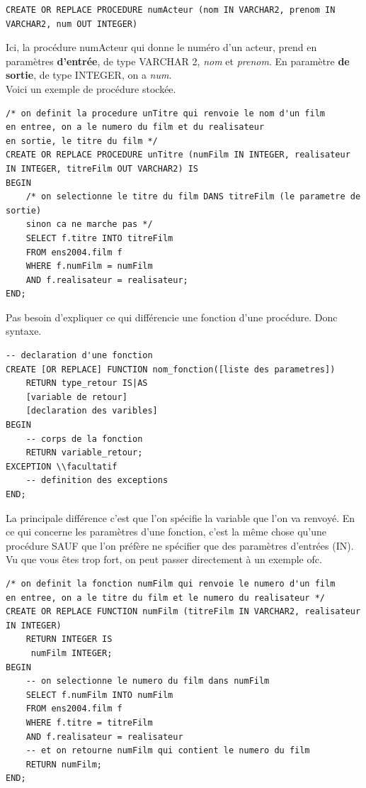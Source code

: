 \documentclass{report}
\begin{document}
\begin{lstlisting}[style=MySQLStyle]
CREATE OR REPLACE PROCEDURE numActeur (nom IN VARCHAR2, prenom IN VARCHAR2, num OUT INTEGER)
\end{lstlisting}

Ici, la procédure numActeur qui donne le numéro d'un acteur, prend en paramètres \textbf{d'entrée}, de type VARCHAR 2, \textit{nom} et \textit{prenom}. En paramètre \textbf{de sortie}, de type INTEGER, on a \textit{num}.\\

Voici un exemple de procédure stockée.

\begin{lstlisting}[style=MySQLStyle]
/* on definit la procedure unTitre qui renvoie le nom d'un film
en entree, on a le numero du film et du realisateur
en sortie, le titre du film */
CREATE OR REPLACE PROCEDURE unTitre (numFilm IN INTEGER, realisateur IN INTEGER, titreFilm OUT VARCHAR2) IS
BEGIN
	/* on selectionne le titre du film DANS titreFilm (le parametre de sortie)
	sinon ca ne marche pas */
	SELECT f.titre INTO titreFilm
	FROM ens2004.film f
	WHERE f.numFilm = numFilm
	AND f.realisateur = realisateur;
END;
\end{lstlisting}

Pas besoin d'expliquer ce qui différencie une fonction d'une procédure. Donc syntaxe.
\begin{lstlisting}[style=MySQLStyle]
-- declaration d'une fonction
CREATE [OR REPLACE] FUNCTION nom_fonction([liste des parametres]) 
	RETURN type_retour IS|AS
	[variable de retour]
	[declaration des varibles]
BEGIN
	-- corps de la fonction
	RETURN variable_retour;
EXCEPTION \\facultatif
	-- definition des exceptions
END;
\end{lstlisting}
La principale différence c'est que l'on spécifie la variable que l'on va renvoyé.
En ce qui concerne les paramètres d'une fonction, c'est la même chose qu'une procédure SAUF que l'on préfère ne spécifier que des paramètres d'entrées (IN).\\
Vu que vous êtes trop fort, on peut passer directement à un exemple ofc.
\begin{lstlisting}[style=MySQLStyle]
/* on definit la fonction numFilm qui renvoie le numero d'un film
en entree, on a le titre du film et le numero du realisateur */
CREATE OR REPLACE FUNCTION numFilm (titreFilm IN VARCHAR2, realisateur IN INTEGER)
	RETURN INTEGER IS
	 numFilm INTEGER;
BEGIN
	-- on selectionne le numero du film dans numFilm
	SELECT f.numFilm INTO numFilm
	FROM ens2004.film f
	WHERE f.titre = titreFilm
	AND f.realisateur = realisateur
	-- et on retourne numFilm qui contient le numero du film
	RETURN numFilm;
END;
\end{lstlisting}
\end{document}
